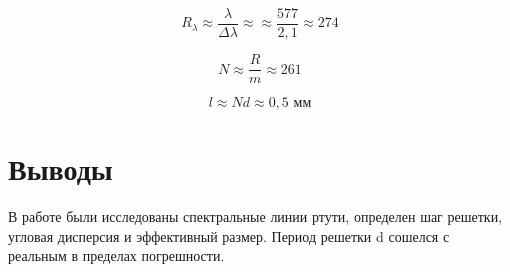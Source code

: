 \documentclass[a4paper, 12pt]{article}
\begin{document}
\begin{equation*}
	R_{\lambda} \approx \frac{\lambda}{\Delta\lambda} \approx \approx \frac{577}{2,1} \approx 274
\end{equation*}

\begin{equation*}
	N \approx \frac{R}{m} \approx 261
\end{equation*}

\begin{equation*}
	l \approx Nd \approx 0,5 \text{ мм}
\end{equation*}

\section{Выводы}
В работе были исследованы спектральные линии ртути, определен шаг решетки, угловая дисперсия и эффективный размер.
Период решетки d сошелся с реальным в пределах погрешности.
\end{document}
